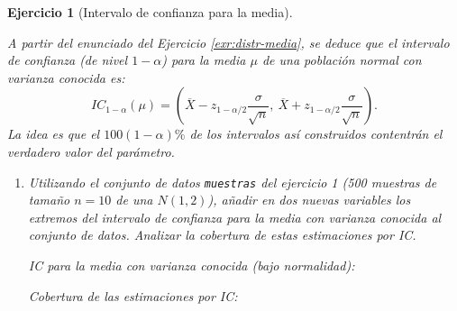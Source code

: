 \documentclass[
  spanish,
  10pt,
]{book}
\newenvironment{Shaded}{\begin{snugshade}}{\end{snugshade}}
\newcommand{\CommentTok}[1]{\textcolor[rgb]{0.56,0.35,0.01}{\textit{#1}}}
\newcommand{\DecValTok}[1]{\textcolor[rgb]{0.00,0.00,0.81}{#1}}
\newcommand{\FloatTok}[1]{\textcolor[rgb]{0.00,0.00,0.81}{#1}}
\newcommand{\FunctionTok}[1]{\textcolor[rgb]{0.13,0.29,0.53}{\textbf{#1}}}
\newcommand{\NormalTok}[1]{#1}
\newcommand{\OtherTok}[1]{\textcolor[rgb]{0.56,0.35,0.01}{#1}}
\newcommand{\SpecialCharTok}[1]{\textcolor[rgb]{0.81,0.36,0.00}{\textbf{#1}}}
\theoremstyle{break}
\newtheorem{exercise}{Ejercicio}[chapter]
\theoremstyle{nonumberplain}
\renewcommand{\CommentTok}[1]{\textcolor[rgb]{0.41,0.41,0.41}{\texttt{#1}}}
\begin{document}
\begin{exercise}[Intervalo de confianza para la media]
\protect\hypertarget{exr:ic-media}{}\label{exr:ic-media}

A partir del enunciado del Ejercicio \ref{exr:distr-media}, se deduce que el intervalo de confianza (de nivel \(1-\alpha\)) para la media \(\mu\) de una población normal con varianza conocida es:
\[IC_{1-\alpha}\left(  \mu\right)  = 
\left(  \overline{X}-z_{1-\alpha/2}\dfrac{\sigma}{\sqrt{n}},\ \overline{X} 
+ z_{1-\alpha/2}\dfrac{\sigma}{\sqrt{n}} \right).\]
La idea es que el \(100(1-\alpha)\%\) de los intervalos así construidos contentrán el verdadero valor del parámetro.

\begin{enumerate}
\def\labelenumi{\alph{enumi})}
\item
  Utilizando el conjunto de datos \texttt{muestras} del ejercicio 1 (500
  muestras de tamaño \(n=10\) de una \(N(1,2)\)), añadir en dos nuevas
  variables los extremos del intervalo de confianza para la media
  con varianza conocida al conjunto de datos. Analizar la
  cobertura de estas estimaciones por IC.

  IC para la media con varianza conocida (bajo normalidad):

\begin{Shaded}
\end{Shaded}

  Cobertura de las estimaciones por IC:

\begin{Shaded}
\end{Shaded}


\end{enumerate}
\end{exercise}
\end{document}
